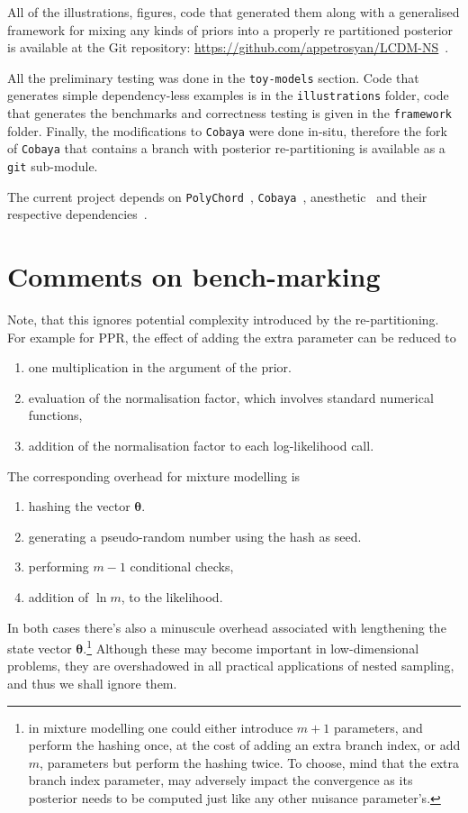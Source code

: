 \documentclass[usenatbib]{mnras}
\begin{document}
All of the illustrations, figures, code that generated them along
with a generalised framework for mixing any kinds of priors into a
properly re partitioned posterior is available at the Git
repository: \url{https://github.com/appetrosyan/LCDM-NS}~\cite{sspr}.

All the preliminary testing was done in the \texttt{toy-models}
section. Code that generates simple dependency-less examples is in
the \texttt{illustrations} folder, code that generates the benchmarks and
correctness testing is given in the \texttt{framework} folder. Finally,
the modifications to \texttt{Cobaya} were done in-situ, therefore the fork
of \texttt{Cobaya} that contains a branch with posterior re-partitioning is
available as a \texttt{git} sub-module.

The current project depends on \texttt{PolyChord}~\cite{polychord}, \texttt{Cobaya}~\cite{cobaya}, anesthetic~\cite{anesthetic} and their respective
dependencies~\cite{Blas_2011}.
\section{Comments on bench-marking}\label{sec:org7f6919e}
Note, that this ignores potential complexity introduced by the
re-partitioning. For example for PPR, the effect of adding the
extra parameter can be reduced to 
\begin{enumerate}
\item one multiplication in the argument of the prior.
\item evaluation of the normalisation factor, which involves standard
numerical functions,
\item addition of the normalisation factor to each log-likelihood call.
\end{enumerate}

The corresponding overhead for mixture modelling is
\begin{enumerate}
\item hashing the vector \(\bm{\theta}\).
\item generating a pseudo-random number using the hash as seed.
\item performing \(m-1\) conditional checks,
\item addition of \(\ln m\), to the likelihood.
\end{enumerate}

In both cases there's also a minuscule overhead associated with
lengthening the state vector \(\bm{\theta}\).\footnote{in mixture modelling
one could either introduce \(m+1\) parameters, and perform the
hashing once, at the cost of adding an extra branch index, or add
\(m\), parameters but perform the hashing twice. To choose, mind that
the extra branch index parameter, may adversely impact the
convergence as its posterior needs to be computed just like any
other nuisance parameter's.}  Although these may become important
in low-dimensional problems, they are overshadowed in all practical
applications of nested sampling, and thus we shall ignore them.
\end{document}
